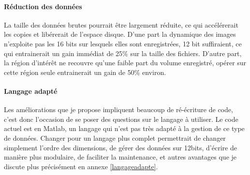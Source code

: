 
\paragraph{Réduction des données}
La taille des données brutes pourrait être largement réduite, ce qui accélérerait les copies et libérerait de l'espace disque. D'une part la dynamique des images n'exploite pas les 16 bits sur lesquels elles sont enregistrées, 12 bit suffiraient, ce qui entrainerait un gain immédiat de 25\% sur la taille des fichiers. D'autre part, la région d'intérêt ne recouvre qu'une faible part du volume enregistré, opérer sur cette région seule entrainerait un gain de 50\% environ.


\paragraph{Langage adapté}
Les améliorations que je propose impliquent beaucoup de ré-écriture de code, c'est donc l'occasion de se poser des questions sur le langage à utiliser. Le code actuel est en Matlab, un langage qui n'est pas très adapté à la gestion de ce type de données. Changer pour un langage plus complet permettrait de changer simplement l'ordre des dimensions, de gérer des données sur 12bits, d'écrire de manière plus modulaire, de faciliter la maintenance, et autres avantages que je discute plus précisément en annexe \ref{langageadapte}.



